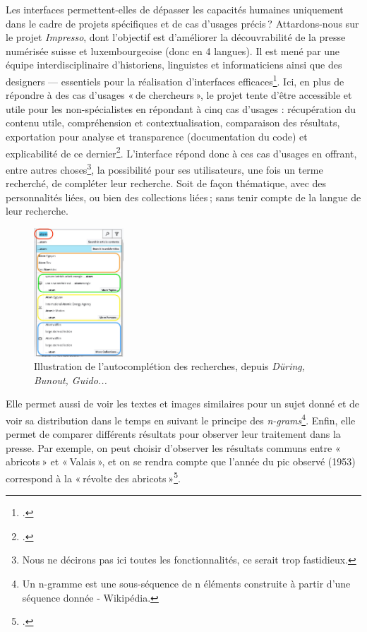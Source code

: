 Les interfaces permettent-elles de dépasser les capacités humaines uniquement dans le cadre de projets spécifiques et de cas d’usages précis ? Attardons-nous sur le projet \textit{Impresso}, dont l’objectif est d’améliorer la découvrabilité de la presse numérisée suisse et luxembourgeoise (donc en 4 langues). Il est mené par une équipe interdisciplinaire d’historiens, linguistes et informaticiens ainsi que des designers — essentiels pour la réalisation d’interfaces efficaces\footcite{ehrmann_explorer_2021}. Ici, en plus de répondre à des cas d’usages « de chercheurs », le projet tente d’être accessible et utile pour les non-spécialistes en répondant à cinq cas d’usages : récupération du contenu utile, compréhension et contextualisation, comparaison des résultats, exportation pour analyse et transparence (documentation du code) et explicabilité de ce dernier\footcite[pp. 5-7]{during_transparent_2024}. L’interface répond donc à ces cas d’usages en offrant, entre autres choses\footnote{Nous ne décirons pas ici toutes les fonctionnalités, ce serait trop fastidieux.}, la possibilité pour ses utilisateurs, une fois un terme recherché, de compléter leur recherche. Soit de façon thématique, avec des personnalités liées, ou bien des collections liées ; sans tenir compte de la langue de leur recherche.

\begin{figure}[h!]
	\centering
	\includegraphics[width=0.3\textwidth]{images/image16.png}
	\caption{Illustration de l'autocomplétion des recherches, depuis \textit{Düring, Bunout, Guido...}}
	\label{fig:image16}
\end{figure}
\newpage

Elle permet aussi de voir les textes et images similaires pour un sujet donné et de voir sa distribution dans le temps en suivant le principe des \textit{n-grams}\footnote{ Un n-gramme est une sous-séquence de n éléments construite à partir d'une séquence donnée - Wikipédia. }. Enfin, elle permet de comparer différents résultats pour observer leur traitement dans la presse. Par exemple, on peut choisir d’observer les résultats communs entre « abricots » et « Valais », et on se rendra compte que l’année du pic observé (1953) correspond à la « révolte des abricots »\footcite{noauthor_revolte_2018}.


